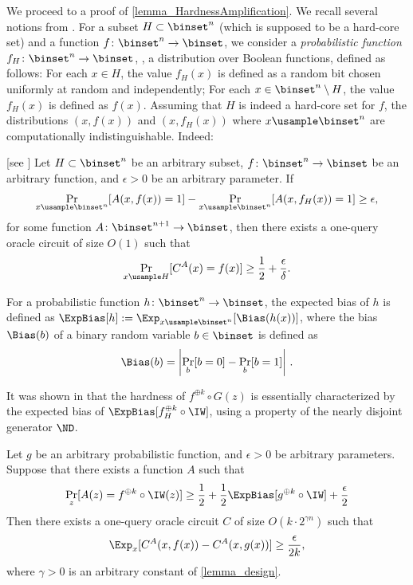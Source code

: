 \documentclass{toc}
\begin{document}
We proceed to a proof of \cref{lemma_HardnessAmplification}.
%
%
We recall  %
several notions from \cite{HealyVV06_siamcomp_journals}.
For a subset $H \subset \binset^n$ (which is supposed to be a hard-core set) and a function $f \colon \binset^n \to \binset$,
we consider a \emph{probabilistic function} $f_H \colon \binset^n \to \binset$, \ie, a distribution over %
Boolean functions,  %
defined as follows:
For each $x \in H$, the value $f_H(x)$ is defined as a random bit chosen uniformly at random and independently;
For each $x \in \binset^n \setminus H$, the value $f_H(x)$ is defined as $f(x)$.
Assuming that $H$ is indeed a hard-core set for $f$, the distributions $(x, f(x))$ and $(x, f_H(x))$ where $x \usample \binset^n$ are computationally indistinguishable. Indeed:
\begin{proposition}
  [see \cite{Trevisa03_focs_conf}]  %
  \label{prop_HardcoreAndProbabilisticFunction}
  Let $H \subset \binset^n$ be an arbitrary subset, $f \colon \binset^n \to \binset$ be an arbitrary function, and $\epsilon > 0$ be an arbitrary parameter.
  If
  \begin{align*}
    \Pr_{x \usample \binset^n}[ A(x, f(x)) = 1 ] - \Pr_{x \usample \binset^n}[ A(x, f_H(x)) = 1 ] \ge \epsilon,
  \end{align*}
  for some function $A \colon \binset^{n + 1} \to \binset$,
  then
  there exists a one-query oracle circuit of size $O(1)$ such that
  \begin{align*}
    \Pr_{x \usample H} [ C^A(x) = f(x) ] \ge \frac{1}{2} + \frac{\epsilon} {\delta}.
  \end{align*}
\end{proposition}

%
%
For a probabilistic function $h \colon \binset^n \to \binset$,
the expected bias of $h$ is defined as $\ExpBias[h] := \Exp_{x \usample \binset^n} [ \Bias(h(x)) ]$,
%
%
%
%
%
where the bias $\Bias(b)$ of a binary random variable $b \in \binset$ is defined as
\[ \Bias(b) = \left| \Pr_b[b = 0] - \Pr_b[b = 1] \right| \,. \]

It was shown in \cite{HealyVV06_siamcomp_journals} that the hardness of $f^{\oplus k} \circ G(z)$ is essentially characterized
by the expected bias of $\ExpBias[ f_H^{\oplus k} \circ \IW ]$,
%
%
using a property of the nearly disjoint generator $\ND$.
\begin{lemma}
  \label{lemma_ExpectedBiasCharacterization}
  Let $g$ be an arbitrary probabilistic function, and $\epsilon> 0$ be arbitrary parameters.
  Suppose that there exists a function $A$ such that
  $$
    \Pr_z [ A(z) = f^{\oplus k} \circ \IW (z) ] \ge \frac{1}{2} + \frac{1}{2} \ExpBias[ g^{\oplus k} \circ \IW ] + \frac{\epsilon}{2}
  $$
  Then there exists a one-query oracle circuit $C$ of size $O(k \cdot 2^{\gamma n})$ such that
  $$
    \Exp_x [ C^A(x, f(x)) - C^A(x, g(x)) ] \ge \frac{\epsilon}{ 2k},
  $$
  where $\gamma > 0$ is an arbitrary constant of \cref{lemma_design}.
\end{lemma}
\end{document}
